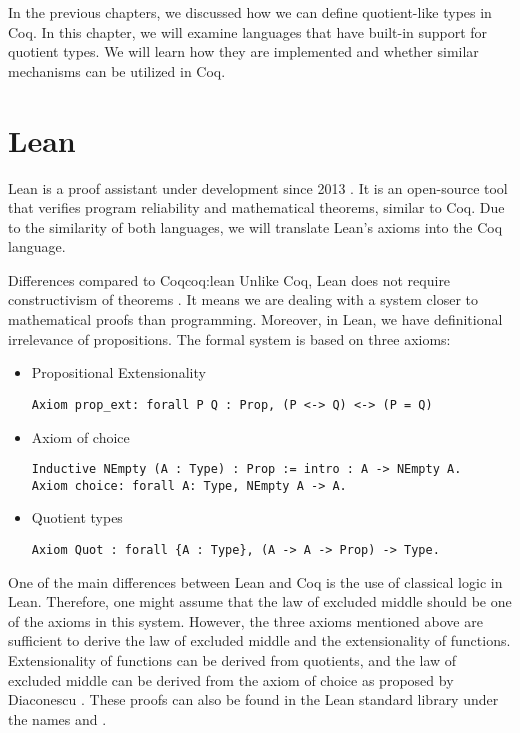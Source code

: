 In the previous chapters, we discussed how we can define quotient-like types in Coq. In this chapter, we will examine languages that have built-in support for quotient types. We will learn how they are implemented and whether similar mechanisms can be utilized in Coq.
\section{Lean}
Lean is a proof assistant under development since 2013 \cite{lean4}. It is an open-source tool that verifies program reliability and mathematical theorems, similar to Coq. Due to the similarity of both languages, we will translate Lean's axioms into the Coq language.
\begin{coq}{Differences compared to Coq}{coq:lean}
Unlike Coq, Lean does not require constructivism of theorems \cite{lean4}. It means we are dealing with a system closer to mathematical proofs than programming. Moreover, in Lean, we have definitional irrelevance of propositions. The formal system is based on three axioms:
\begin{itemize}
    \item{Propositional Extensionality}
\begin{verbatim}
Axiom prop_ext: forall P Q : Prop, (P <-> Q) <-> (P = Q)
\end{verbatim}
    \item{Axiom of choice}
\begin{verbatim}
Inductive NEmpty (A : Type) : Prop := intro : A -> NEmpty A.
Axiom choice: forall A: Type, NEmpty A -> A.
\end{verbatim}
    \item{Quotient types}
\begin{verbatim}
Axiom Quot : forall {A : Type}, (A -> A -> Prop) -> Type.
\end{verbatim}
\end{itemize}
One of the main differences between Lean and Coq is the use of classical logic in Lean. Therefore, one might assume that the law of excluded middle should be one of the axioms in this system. However, the three axioms mentioned above are sufficient to derive the law of excluded middle and the extensionality of functions. Extensionality of functions can be derived from quotients, and the law of excluded middle can be derived from the axiom of choice as proposed by Diaconescu \cite{choise}. These proofs can also be found in the Lean standard library under the names  and .
\end{coq}
